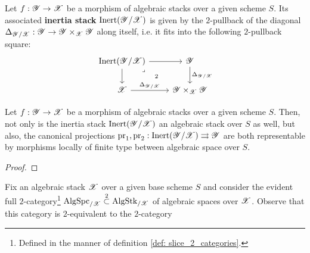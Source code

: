             \begin{definition} \label{def: inertia_stacks}
                Let $f: \mathscr{Y} \to \mathscr{X}$ be a morphism of algebraic stacks over a given scheme $S$. Its associated \textbf{inertia stack} $\mathrm{Inert}(\mathscr{Y}/\mathscr{X})$ is given by the $2$-pullback of the diagonal $\Delta_{\scrY/\scrX}: \scrY \to \scrY \x_{\scrX} \scrY$ along itself, i.e. it fits into the following $2$-pullback square:
                    $$
                        \begin{tikzcd}
                        	{\Inert(\scrY/\scrX)} & \scrY \\
                        	\scrX & {\scrY \x_{\scrX} \scrY}
                        	\arrow["{\Delta_{\scrY/\scrX}}", from=2-1, to=2-2]
                        	\arrow["{\Delta_{\scrY/\scrX}}", from=1-2, to=2-2]
                        	\arrow[from=1-1, to=2-1]
                        	\arrow[from=1-1, to=1-2]
                        	\arrow["2"{description}, "\lrcorner"{anchor=center, pos=0.125}, draw=none, from=1-1, to=2-2]
                        \end{tikzcd}
                    $$
            \end{definition}
            \begin{proposition} \label{prop: properties_of_inertia_stacks}
                Let $f: \mathscr{Y} \to \mathscr{X}$ be a morphism of algebraic stacks over a given scheme $S$. Then, not only is the inertia stack $\mathrm{Inert}(\mathscr{Y}/\mathscr{X})$ an algebraic stack over $S$ as well, but also, the canonical projections $\operatorname{pr}_1, \operatorname{pr}_2: \mathrm{Inert}(\mathscr{Y}/\mathscr{X}) \rightrightarrows \mathscr{Y}$ are both representable by morphisms locally of finite type between algebraic space over $S$. 
            \end{proposition}
                \begin{proof}
                    
                \end{proof}
            \begin{remark} \label{remark: inertia_and_automorphisms}
                Fix an algebraic stack $\mathscr{X}$ over a given base scheme $S$ and consider the evident full $2$-category\footnote{Defined in the manner of definition \ref{def: slice_2_categories}.} $\mathrm{Alg}\mathrm{Spc}_{/\mathscr{X}} \overset{2}{\subset} \mathrm{Alg}\mathrm{Stk}_{/\mathscr{X}}$ of algebraic spaces over $\mathscr{X}$. Observe that this category is $2$-equivalent to the $2$-category 
            \end{remark}
